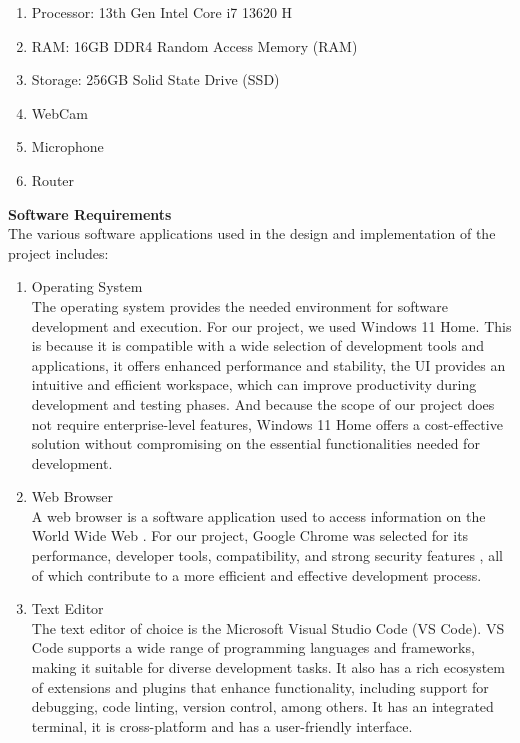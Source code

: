 \documentclass[a4paper,12pt]{article}  %
\begin{document}
\begin{enumerate}
      \item Processor: 13th Gen Intel Core i7 13620 H
      \item RAM: 16GB DDR4 Random Access Memory (RAM)
      \item Storage: 256GB Solid State Drive (SSD)
      \item WebCam
      \item Microphone
      \item Router
\end{enumerate}

\textbf{Software Requirements}\\
The various software applications used in the design and implementation of the project includes:\\
\begin{enumerate}
      \item Operating System\\
      The operating system provides the needed environment for software development and execution. For our project, we used Windows 11 Home. This is because it is compatible with a wide selection of development tools and applications, it offers enhanced performance and stability, the UI provides an intuitive and efficient workspace, which can improve productivity during development and testing phases. And because the scope of our project does not require enterprise-level features, Windows 11 Home offers a cost-effective solution without compromising on the essential functionalities needed for development.

      \item Web Browser\\
      A web browser is a software application used to access information on the World Wide Web \cite{byjus2024}. For our project, Google Chrome was selected for its performance, developer tools, compatibility,  and strong security features \cite{emmanuel2022design}, all of which contribute to a more efficient and effective development process.\\
      \item Text Editor\\
      The text editor of choice is the Microsoft Visual Studio Code (VS Code).  VS Code supports a wide range of programming languages and frameworks, making it suitable for diverse development tasks. It also has a rich ecosystem of extensions and plugins that enhance functionality, including support for debugging, code linting, version control, among others. It has an integrated terminal, it is cross-platform and has a user-friendly interface. \\
      

\end{enumerate}
\end{document}

